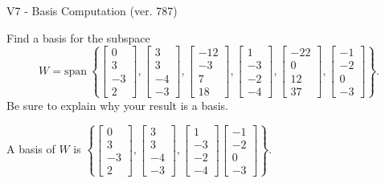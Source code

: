 \begin{exercise}
  \begin{exerciseTitle}V7 - Basis Computation (ver. 787)\end{exerciseTitle}
  \begin{exerciseStatement}
    Find a basis for the subspace 
\[W=\mathrm{span}\ \left\{\left[\begin{array}{r}
0 \\
3 \\
-3 \\
2
\end{array}\right] , \left[\begin{array}{r}
3 \\
3 \\
-4 \\
-3
\end{array}\right] , \left[\begin{array}{r}
-12 \\
-3 \\
7 \\
18
\end{array}\right] , \left[\begin{array}{r}
1 \\
-3 \\
-2 \\
-4
\end{array}\right] , \left[\begin{array}{r}
-22 \\
0 \\
12 \\
37
\end{array}\right] , \left[\begin{array}{r}
-1 \\
-2 \\
0 \\
-3
\end{array}\right]\right\}.\]
 Be sure to explain why your result is a basis.


  \end{exerciseStatement}
  \begin{exerciseAnswer}
   A basis of \(W\) is  \(\left\{\left[\begin{array}{r}
0 \\
3 \\
-3 \\
2
\end{array}\right] , \left[\begin{array}{r}
3 \\
3 \\
-4 \\
-3
\end{array}\right] , \left[\begin{array}{r}
1 \\
-3 \\
-2 \\
-4
\end{array}\right] \left[\begin{array}{r}
-1 \\
-2 \\
0 \\
-3
\end{array}\right]\right\}\).
  


  \end{exerciseAnswer}
\end{exercise}